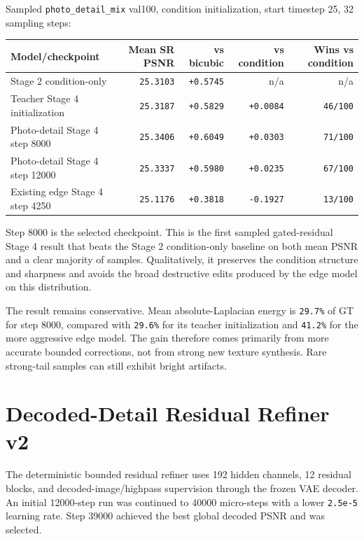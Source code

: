 \documentclass[
  10pt,
]{article}
\begin{document}
Sampled \texttt{photo\_detail\_mix} val100, condition initialization,
start timestep 25, 32 sampling steps:

\begin{longtable}[]{@{}lrrrr@{}}
\toprule\noalign{}
Model/checkpoint & Mean SR PSNR & vs bicubic & vs condition & Wins vs
condition \\
\midrule\noalign{}
\endhead
\bottomrule\noalign{}
\endlastfoot
Stage 2 condition-only & \texttt{25.3103} & \texttt{+0.5745} & n/a &
n/a \\
Teacher Stage 4 initialization & \texttt{25.3187} & \texttt{+0.5829} &
\texttt{+0.0084} & \texttt{46/100} \\
Photo-detail Stage 4 step 8000 & \texttt{25.3406} & \texttt{+0.6049} &
\texttt{+0.0303} & \texttt{71/100} \\
Photo-detail Stage 4 step 12000 & \texttt{25.3337} & \texttt{+0.5980} &
\texttt{+0.0235} & \texttt{67/100} \\
Existing edge Stage 4 step 4250 & \texttt{25.1176} & \texttt{+0.3818} &
\texttt{-0.1927} & \texttt{13/100} \\
\end{longtable}

Step 8000 is the selected checkpoint. This is the first sampled
gated-residual Stage 4 result that beats the Stage 2 condition-only
baseline on both mean PSNR and a clear majority of samples.
Qualitatively, it preserves the condition structure and sharpness and
avoids the broad destructive edits produced by the edge model on this
distribution.

The result remains conservative. Mean absolute-Laplacian energy is
\texttt{29.7\%} of GT for step 8000, compared with \texttt{29.6\%} for
its teacher initialization and \texttt{41.2\%} for the more aggressive
edge model. The gain therefore comes primarily from more accurate
bounded corrections, not from strong new texture synthesis. Rare
strong-tail samples can still exhibit bright artifacts.

\hypertarget{decoded-detail-residual-refiner-v2}{%
\section{Decoded-Detail Residual Refiner
v2}\label{decoded-detail-residual-refiner-v2}}

The deterministic bounded residual refiner uses 192 hidden channels, 12
residual blocks, and decoded-image/highpass supervision through the
frozen VAE decoder. An initial 12000-step run was continued to 40000
micro-steps with a lower \texttt{2.5e-5} learning rate. Step 39000
achieved the best global decoded PSNR and was selected.
\end{document}
